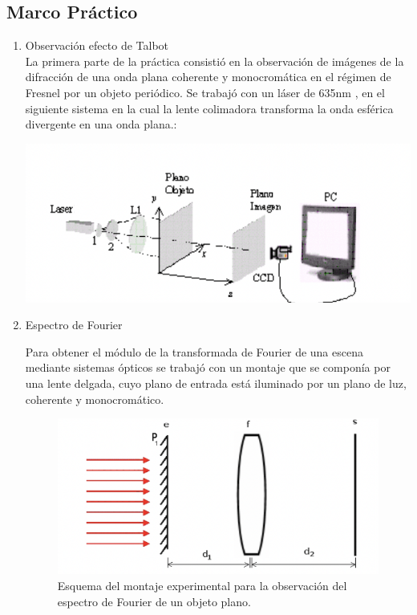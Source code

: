\documentclass{./packages/optica-article}
\begin{document}
\subsection{Marco Práctico}
    \begin{enumerate}
    \item Observación efecto de Talbot\\
La primera parte de la práctica consistió en la observación de imágenes de la difracción de una onda plana coherente y monocromática en el régimen de Fresnel por un objeto periódico. 
Se trabajó con un láser de 635nm , en el siguiente sistema en la cual la lente colimadora transforma la onda esférica divergente en una onda plana.:

\begin{center}
    \includegraphics[scale=1]{sistematalbot.png}
    \label{fig:talbot} %
\end{center}

    \item Espectro de Fourier

Para obtener el módulo de la transformada de Fourier de una escena mediante sistemas ópticos se trabajó con un montaje que se componía por una lente delgada, cuyo plano de entrada está iluminado por un plano de luz, coherente y monocromático. 

\begin{figure}[h]
    \centering
    \includegraphics[scale=1]{sistemaespectrodefourier.png}
    \caption{Esquema del montaje experimental para la observación del espectro de Fourier de un objeto plano. }
    \label{fouriersistema}
    \end{figure}
    

\end{enumerate}
\end{document}
